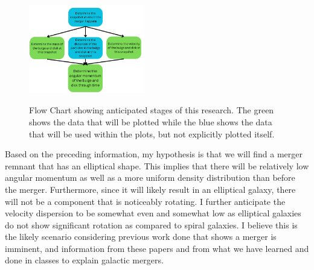 \documentclass[twocolumn]{aastex631}
\begin{document}
\begin{figure}
    \centering
    \includegraphics[width = 0.45\textwidth]{Updated Figure 2.png}
    \label{Figure 2}
    \caption{Flow Chart showing anticipated stages of this research. The green shows the data that will be plotted while the blue shows the data that will be used within the plots, but not explicitly plotted itself.}
\end{figure}


Based on the preceding information, my hypothesis is that we will find a merger remnant that has an elliptical shape. This implies that there will be relatively low angular momentum as well as a more uniform density distribution than before the merger. Furthermore, since it will likely result in an elliptical galaxy, there will not be a component that is noticeably rotating. I further anticipate the velocity dispersion to be somewhat even and somewhat low as elliptical galaxies do not show significant rotation as compared to spiral galaxies. I believe this is the likely scenario considering previous work done that shows a merger is imminent, and information from these papers and from what we have learned and done in classes to explain galactic mergers. 



\end{document}
